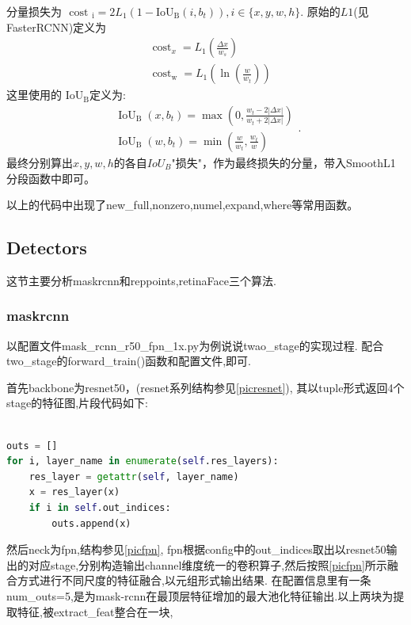\documentclass[UTF8]{ctexart}
\begin{document}
分量损失为
$
\text { cost }_{\mathrm{i}}=
2 L_{1}\left(1-\mathrm{I} \mathrm{o} \mathrm{U}_{\mathrm{B}}\left(i, b_{t}\right)\right)
, i \in \{x, y, w, h\}.$
原始的$L1$(见FasterRCNN)定义为
$$
\begin{aligned}
	&\operatorname{cost}_{x}=L_{1}\left(\frac{\Delta x}{w_{s}}\right)\\
	&\operatorname{cost}_{\mathrm{w}}=L_{1}\left(\ln \left(\frac{w}{w_{t}}\right)\right)
	\end{aligned}
$$
这里使用的
$\mathrm{IoU}_{\mathrm{B}}$定义为:
$$
\begin{array}{l}
	\operatorname{IoU}_{\mathrm{B}}\left(x, b_{t}\right)=\max \left(0, \frac{w_{t}-2|\Delta x|}{w_{t}+2|\Delta x|}\right) \\
	\operatorname{IoU}_{\mathrm{B}}\left(w, b_{t}\right)=\min \left(\frac{w}{w_{t}}, \frac{w_{t}}{w}\right)
	\end{array}.
$$
最终分别算出$x,y,w,h$的各自$IoU_B$"损失"，作为最终损失的分量，带入SmoothL1分段函数中即可。


以上的代码中出现了new\_full,nonzero,numel,expand,where等常用函数。


\subsection{Detectors}
这节主要分析maskrcnn和reppoints,retinaFace三个算法.

\subsubsection{maskrcnn}
\label{maskrcnn}
以配置文件mask\_rcnn\_r50\_fpn\_1x.py为例说说twao\_stage的实现过程.
配合two\_stage的forward\_train()函数和配置文件,即可.

首先backbone为resnet50，(resnet系列结构参见\ref{picresnet}),
其以tuple形式返回4个stage的特征图,片段代码如下:
\lstset{style=mystyle}
\begin{lstlisting}[language=Python]

outs = []
for i, layer_name in enumerate(self.res_layers):
	res_layer = getattr(self, layer_name)
	x = res_layer(x)
	if i in self.out_indices:
		outs.append(x)

\end{lstlisting}

然后neck为fpn,结构参见\ref{picfpn},
fpn根据config中的out\_indices取出以resnet50输出的对应stage,分别构造输出channel维度统一的卷积算子,然后按照\ref{picfpn}所示融合方式进行不同尺度的特征融合,以元组形式输出结果.
在配置信息里有一条num\_outs=5,是为mask-rcnn在最顶层特征增加的最大池化特征输出.以上两块为提取特征,被extract\_feat整合在一块,
\end{document}
